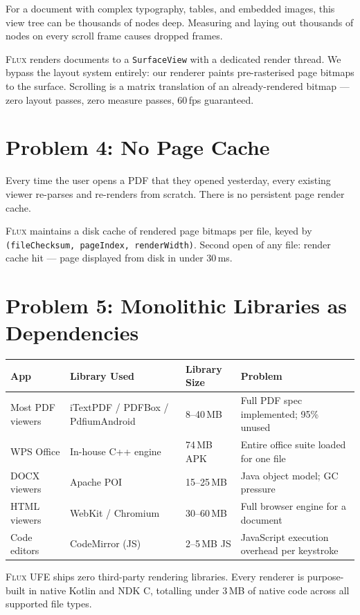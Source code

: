\documentclass[11pt, a4paper, openright]{report}
\newcommand{\flux}{\textsc{Flux}}
\begin{document}
For a document with complex typography, tables, and embedded images, this view tree can be thousands of nodes deep. Measuring and laying out thousands of nodes on every scroll frame causes dropped frames.

\flux{} renders documents to a \texttt{SurfaceView} with a dedicated render thread. We bypass the layout system entirely: our renderer paints pre-rasterised page bitmaps to the surface. Scrolling is a matrix translation of an already-rendered bitmap --- zero layout passes, zero measure passes, 60\,fps guaranteed.

\section{Problem 4: No Page Cache}

Every time the user opens a PDF that they opened yesterday, every existing viewer re-parses and re-renders from scratch. There is no persistent page render cache.

\flux{} maintains a disk cache of rendered page bitmaps per file, keyed by \texttt{(fileChecksum, pageIndex, renderWidth)}. Second open of any file: render cache hit --- page displayed from disk in under 30\,ms.

\section{Problem 5: Monolithic Libraries as Dependencies}

\begin{longtable}{@{}p{28mm}p{30mm}p{28mm}p{55mm}@{}}
\toprule
\textbf{App} & \textbf{Library Used} & \textbf{Library Size} & \textbf{Problem} \\
\midrule
Most PDF viewers & iTextPDF / PDFBox / PdfiumAndroid & 8--40\,MB & Full PDF spec implemented; 95\% unused \\
WPS Office & In-house C++ engine & 74\,MB APK & Entire office suite loaded for one file \\
DOCX viewers & Apache POI & 15--25\,MB & Java object model; GC pressure \\
HTML viewers & WebKit / Chromium & 30--60\,MB & Full browser engine for a document \\
Code editors & CodeMirror (JS) & 2--5\,MB JS & JavaScript execution overhead per keystroke \\
\bottomrule
\end{longtable}

\flux{} UFE ships zero third-party rendering libraries. Every renderer is purpose-built in native Kotlin and NDK C, totalling under 3\,MB of native code across all supported file types.
\end{document}
